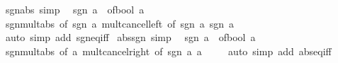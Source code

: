 \begin{isabellebody}
\ sgn{\isacharunderscore}{\kern0pt}abs\ {\isacharbrackleft}{\kern0pt}simp{\isacharbrackright}{\kern0pt}{\isacharcolon}{\kern0pt}\isanewline
\ \ {\isachardoublequoteopen}{\isasymbar}sgn\ a{\isasymbar}\ {\isacharequal}{\kern0pt}\ of{\isacharunderscore}{\kern0pt}bool\ {\isacharparenleft}{\kern0pt}a\ {\isasymnoteq}\ {}{\isacharparenright}{\kern0pt}{\isachardoublequoteclose}\isanewline
%
\isadelimproof
\ \ %
\endisadelimproof
%
\isatagproof
{}\isamarkupfalse%
\ sgn{\isacharunderscore}{\kern0pt}mult{\isacharunderscore}{\kern0pt}abs\ {\isacharbrackleft}{\kern0pt}of\ {\isachardoublequoteopen}sgn\ a{\isachardoublequoteclose}{\isacharbrackright}{\kern0pt}\ mult{\isacharunderscore}{\kern0pt}cancel{\isacharunderscore}{\kern0pt}left\ {\isacharbrackleft}{\kern0pt}of\ {\isachardoublequoteopen}sgn\ a{\isachardoublequoteclose}\ {\isachardoublequoteopen}{\isasymbar}sgn\ a{\isasymbar}{\isachardoublequoteclose}\ {}{\isacharbrackright}{\kern0pt}\isanewline
\ \ \isamarkupfalse%
\ {\isacharparenleft}{\kern0pt}auto\ simp\ add{\isacharcolon}{\kern0pt}\ sgn{\isacharunderscore}{\kern0pt}eq{\isacharunderscore}{\kern0pt}{}{\isacharunderscore}{\kern0pt}iff{\isacharparenright}{\kern0pt}%
\endisatagproof
{\isafoldproof}%
%
\isadelimproof
\isanewline
%
\endisadelimproof
\isanewline
{}\isamarkupfalse%
\ abs{\isacharunderscore}{\kern0pt}sgn\ {\isacharbrackleft}{\kern0pt}simp{\isacharbrackright}{\kern0pt}{\isacharcolon}{\kern0pt}\isanewline
\ \ {\isachardoublequoteopen}sgn\ {\isasymbar}a{\isasymbar}\ {\isacharequal}{\kern0pt}\ of{\isacharunderscore}{\kern0pt}bool\ {\isacharparenleft}{\kern0pt}a\ {\isasymnoteq}\ {}{\isacharparenright}{\kern0pt}{\isachardoublequoteclose}\isanewline
%
\isadelimproof
\ \ %
\endisadelimproof
%
\isatagproof
{}\isamarkupfalse%
\ sgn{\isacharunderscore}{\kern0pt}mult{\isacharunderscore}{\kern0pt}abs\ {\isacharbrackleft}{\kern0pt}of\ {\isachardoublequoteopen}{\isasymbar}a{\isasymbar}{\isachardoublequoteclose}{\isacharbrackright}{\kern0pt}\ mult{\isacharunderscore}{\kern0pt}cancel{\isacharunderscore}{\kern0pt}right\ {\isacharbrackleft}{\kern0pt}of\ {\isachardoublequoteopen}sgn\ {\isasymbar}a{\isasymbar}{\isachardoublequoteclose}\ {\isachardoublequoteopen}{\isasymbar}a{\isasymbar}{\isachardoublequoteclose}\ {}{\isacharbrackright}{\kern0pt}\isanewline
\ \ \isamarkupfalse%
\ {\isacharparenleft}{\kern0pt}auto\ simp\ add{\isacharcolon}{\kern0pt}\ abs{\isacharunderscore}{\kern0pt}eq{\isacharunderscore}{\kern0pt}{}{\isacharunderscore}{\kern0pt}iff{\isacharparenright}{\kern0pt}%

\end{isabellebody}
